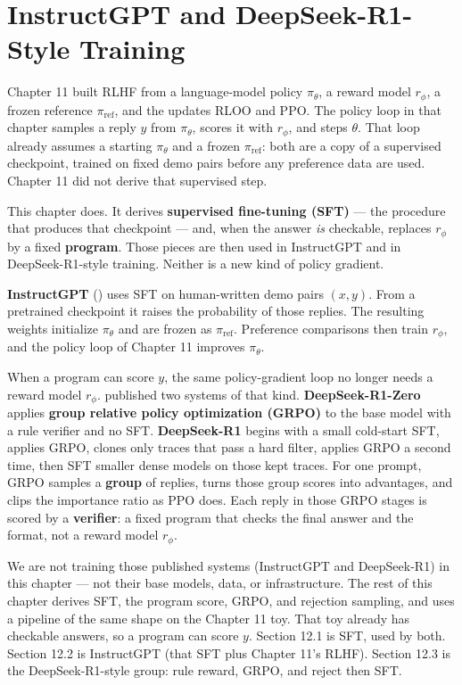 \chapter{InstructGPT and DeepSeek-R1-Style Training}

Chapter 11 built RLHF from a language-model policy $\pi_\theta$, a reward model $r_\phi$, a frozen reference $\pi_{\mathrm{ref}}$, and the updates RLOO and PPO. The policy loop in that chapter samples a reply $y$ from $\pi_\theta$, scores it with $r_\phi$, and steps $\theta$. That loop already assumes a starting $\pi_\theta$ and a frozen $\pi_{\mathrm{ref}}$: both are a copy of a supervised checkpoint, trained on fixed demo pairs before any preference data are used. Chapter 11 did not derive that supervised step.

This chapter does. It derives \textbf{supervised fine-tuning (SFT)} --- the procedure that produces that checkpoint --- and, when the answer \textit{is} checkable, replaces $r_\phi$ by a fixed \textbf{program}. Those pieces are then used in InstructGPT and in DeepSeek-R1-style training. Neither is a new kind of policy gradient.

\textbf{InstructGPT} () uses SFT on human-written demo pairs $(x,y)$. From a pretrained checkpoint it raises the probability of those replies. The resulting weights initialize $\pi_\theta$ and are frozen as $\pi_{\mathrm{ref}}$. Preference comparisons then train $r_\phi$, and the policy loop of Chapter 11 improves $\pi_\theta$.

When a program can score $y$, the same policy-gradient loop no longer needs a reward model $r_\phi$.  published two systems of that kind. \textbf{DeepSeek-R1-Zero} applies \textbf{group relative policy optimization (GRPO)} to the base model with a rule verifier and no SFT. \textbf{DeepSeek-R1} begins with a small cold-start SFT, applies GRPO, clones only traces that pass a hard filter, applies GRPO a second time, then SFT smaller dense models on those kept traces. For one prompt, GRPO samples a \textbf{group} of replies, turns those group scores into advantages, and clips the importance ratio as PPO does. Each reply in those GRPO stages is scored by a \textbf{verifier}: a fixed program that checks the final answer and the format, not a reward model $r_\phi$.

We are not training those published systems (InstructGPT and DeepSeek-R1) in this chapter --- not their base models, data, or infrastructure. The rest of this chapter derives SFT, the program score, GRPO, and rejection sampling, and uses a pipeline of the same shape on the Chapter 11 toy. That toy already has checkable answers, so a program can score $y$. Section 12.1 is SFT, used by both. Section 12.2 is InstructGPT (that SFT plus Chapter 11's RLHF). Section 12.3 is the DeepSeek-R1-style group: rule reward, GRPO, and reject then SFT.

